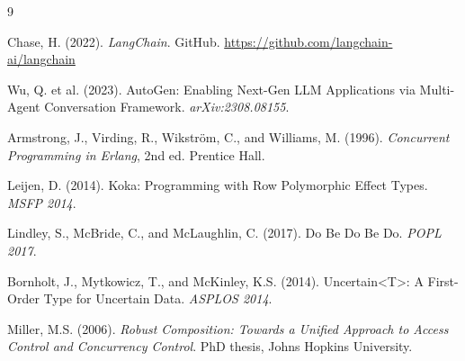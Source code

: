 \documentclass[sigplan,10pt,review,anonymous]{acmart}
\begin{document}

\begin{thebibliography}{9}

Chase, H. (2022). \textit{LangChain}. GitHub.
\url{https://github.com/langchain-ai/langchain}

Wu, Q. et al. (2023). AutoGen: Enabling Next-Gen LLM Applications via
Multi-Agent Conversation Framework. \textit{arXiv:2308.08155}.

Armstrong, J., Virding, R., Wikstr{\"o}m, C., and Williams, M. (1996).
\textit{Concurrent Programming in Erlang}, 2nd ed. Prentice Hall.

Leijen, D. (2014). Koka: Programming with Row Polymorphic Effect Types.
\textit{MSFP 2014}.

Lindley, S., McBride, C., and McLaughlin, C. (2017). Do Be Do Be Do.
\textit{POPL 2017}.

Bornholt, J., Mytkowicz, T., and McKinley, K.S. (2014).
Uncertain\textless T\textgreater: A First-Order Type for Uncertain Data.
\textit{ASPLOS 2014}.

Miller, M.S. (2006). \textit{Robust Composition: Towards a Unified Approach
to Access Control and Concurrency Control}. PhD thesis, Johns Hopkins University.

\end{thebibliography}
\end{document}
